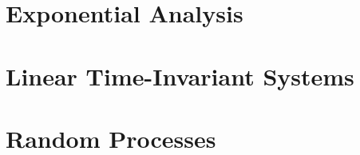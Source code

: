 \documentclass{book}
\theoremstyle{definition}
\begin{document}
	
	\tableofcontents
	\part{Exponential Analysis}
	
		
		
		
		
		
		
	\part{Linear Time-Invariant Systems}
		
		
		
	\part{Random Processes}
		
	
\end{document}
